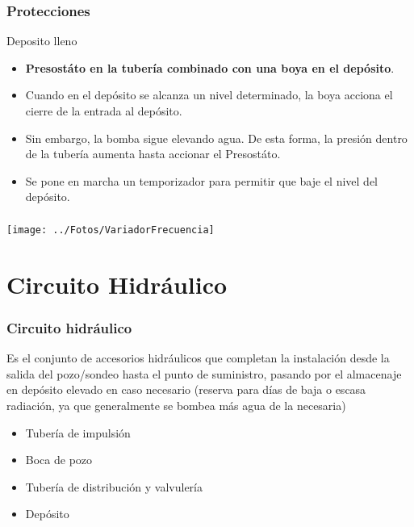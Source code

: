 \documentclass[serif, xcolor=dvipsnames]{beamer}
\begin{document}
\begin{frame}
\frametitle{Protecciones}
\begin{block}
{Deposito lleno}
\begin{itemize}
\item \textbf{Presostáto en la tubería combinado con una boya en el depósito}.
\item Cuando en el depósito se alcanza un nivel determinado, la boya acciona
el cierre de la entrada al depósito.
\item Sin embargo, la bomba sigue elevando agua. De esta forma, la presión
dentro de la tubería aumenta hasta accionar el Presostáto. 
\item Se pone en marcha un temporizador para permitir que baje el nivel
del depósito.
\end{itemize}
\end{block}

\end{frame}

\begin{frame}[plain]
\frametitle{}

\begin{center}
\texttt{[image: ../Fotos/VariadorFrecuencia]}
\par\end{center}


\end{frame}

\section{Circuito Hidráulico}


\begin{frame}
\frametitle{Circuito hidráulico}

Es el conjunto de accesorios hidráulicos que completan la instalación
desde la salida del pozo/sondeo hasta el punto de suministro, pasando
por el almacenaje en depósito elevado en caso necesario (reserva para
días de baja o escasa radiación, ya que generalmente se bombea más
agua de la necesaria) 
\begin{itemize}
\item Tubería de impulsión 
\item Boca de pozo 
\item Tubería de distribución y valvulería 
\item Depósito
\end{itemize}

\end{frame}
\end{document}

